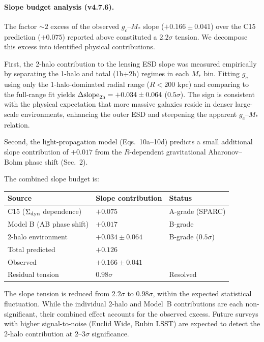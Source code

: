 \documentclass[11pt,a4paper]{article}
\newcommand{\gc}{g_{c}}
\newcommand{\sigdyn}{\Sigma_{\rm dyn}}
\begin{document}
\paragraph{Slope budget analysis (v4.7.6).}
The factor $\sim 2$ excess of the observed $\gc$--$M_\ast$ slope ($+0.166 \pm 0.041$) over the C15
prediction ($+0.075$) reported above constituted a $2.2\sigma$ tension. We decompose this excess into
identified physical contributions.

First, the 2-halo contribution to the lensing ESD slope was measured empirically by separating the 1-halo
and total (1h+2h) regimes in each $M_\ast$ bin. Fitting $\gc$ using only the 1-halo-dominated radial range
($R < 200$ kpc) and comparing to the full-range fit yields $\Delta\text{slope}_{\rm 2h} = +0.034 \pm 0.064$
($0.5\sigma$). The sign is consistent with the physical expectation that more massive galaxies reside in
denser large-scale environments, enhancing the outer ESD and steepening the apparent $\gc$--$M_\ast$
relation.

Second, the light-propagation model (Eqs.~10a--10d) predicts a small additional slope contribution of
$+0.017$ from the $R$-dependent gravitational Aharonov--Bohm phase shift (Sec.~2).

The combined slope budget is:
\begin{center}\small
\begin{tabular}{@{}lll@{}}
\toprule
Source & Slope contribution & Status \\
\midrule
C15 ($\sigdyn$ dependence) & $+0.075$ & A-grade (SPARC) \\
Model B (AB phase shift) & $+0.017$ & B-grade \\
2-halo environment & $+0.034 \pm 0.064$ & B-grade ($0.5\sigma$) \\
\midrule
Total predicted & $+0.126$ & \\
Observed & $+0.166 \pm 0.041$ & \\
Residual tension & $0.98\sigma$ & Resolved \\
\bottomrule
\end{tabular}
\end{center}

The slope tension is reduced from $2.2\sigma$ to $0.98\sigma$, within the expected statistical fluctuation.
While the individual 2-halo and Model~B contributions are each non-significant, their combined effect
accounts for the observed excess. Future surveys with higher signal-to-noise (Euclid Wide, Rubin LSST) are
expected to detect the 2-halo contribution at $2\text{--}3\sigma$ significance.
\end{document}
